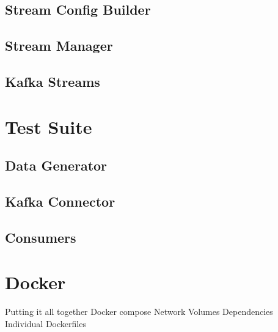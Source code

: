 \subsection{Stream Config Builder}

 
\subsection{Stream Manager}
\subsection{Kafka Streams}

\section{Test Suite}
\subsection{Data Generator}
\subsection{Kafka Connector}
\subsection{Consumers}

\section{Docker}
Putting it all together
Docker compose 
Network 
Volumes
Dependencies
Individual Dockerfiles